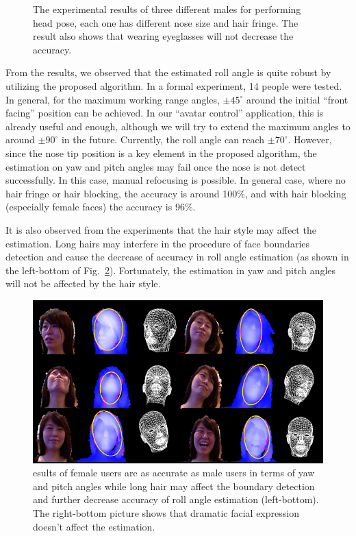 \begin{figure}
\caption{The experimental results of three different males for performing head pose, each one has different nose size and hair fringe. The result also shows that wearing eyeglasses will not decrease the accuracy.}
\label{fig:12}       %
\end{figure}

From the results, we observed that the estimated roll angle is quite robust by utilizing the proposed algorithm. In a formal experiment, 14 people were tested. In general, for the maximum working range angles, $\pm 45^{\circ}$ around the initial “front facing” position can be achieved. In our “avatar control” application, this is already useful and enough, although we will try to extend the maximum angles to around $\pm 90^{\circ}$ in the future. Currently, the roll angle can reach $\pm 70^{\circ}$. However, since the nose tip position is a key element in the proposed algorithm, the estimation on yaw and pitch angles may fail once the nose is not detect successfully. In this case, manual refocusing is possible. In general case, where no hair fringe or hair blocking, the accuracy is around 100\%, and with hair blocking (especially female faces) the accuracy is 96\%.

It is also observed from the experiments that the hair style may affect the estimation. Long hairs may interfere in the procedure of face boundaries detection and cause the decrease of accuracy in roll angle estimation (as shown in the left-bottom of Fig.~\ref{fig:13}). Fortunately, the estimation in yaw and pitch angles will not be affected by the hair style.

\begin{figure}
\includegraphics[width=1.0\linewidth]{./fig13.png}
\caption{esults of female users are as accurate as male users in terms of yaw and pitch angles while long hair may affect the boundary detection and further decrease accuracy of roll angle estimation (left-bottom). The right-bottom picture shows that dramatic facial expression doesn’t affect the estimation.}
\label{fig:13}       %
\end{figure}


